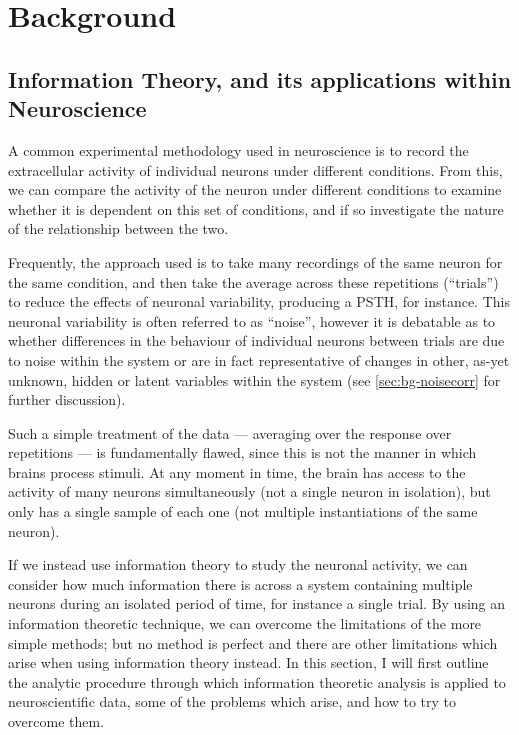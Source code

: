 
\chapter{Background}
\label{ch:bg}

\section{Information Theory, and its applications within Neuroscience}
\label{sec:bgit}

A common experimental methodology used in neuroscience is to record the extracellular activity of individual neurons under different conditions.
From this, we can compare the activity of the neuron under different conditions to examine whether it is dependent on this set of conditions, and if so investigate the nature of the relationship between the two.

Frequently, the approach used is to take many recordings of the same neuron for the same condition, and then take the average across these repetitions (``trials'') to reduce the effects of neuronal variability, producing a \ac{PSTH}, for instance.
This neuronal variability is often referred to as ``noise'', however it is debatable as to whether differences in the behaviour of individual neurons between trials are due to noise within the system or are in fact representative of changes in other, as-yet unknown, hidden or latent variables within the system (see \autoref{sec:bg-noisecorr} for further discussion).

Such a simple treatment of the data --- averaging over the response over repetitions --- is fundamentally flawed, since this is not the manner in which brains process stimuli.
At any moment in time, the brain has access to the activity of many neurons simultaneously (not a single neuron in isolation), but only has a single sample of each one (not multiple instantiations of the same neuron).

If we instead use information theory to study the neuronal activity, we can consider how much information there is across a system containing multiple neurons during an isolated period of time, for instance a single trial.
By using an information theoretic technique, we can overcome the limitations of the more simple methods; but no method is perfect and there are other limitations which arise when using information theory instead.
In this section, I will first outline the analytic procedure through which information theoretic analysis is applied to neuroscientific data, some of the problems which arise, and how to try to overcome them.

